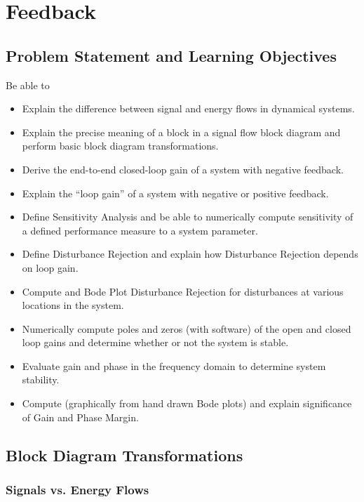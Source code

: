 %
%
%

\chapter{Feedback}\label{FeedbackChapter}

\section{Problem Statement and Learning Objectives}
Be able to

\begin{itemize}
    \item Explain the difference between signal and energy flows in dynamical systems.
    \item Explain the precise meaning of a block in a signal flow block diagram and
    perform basic block diagram transformations.
    \item  Derive the end-to-end closed-loop gain of a system with negative feedback.
    \item Explain the ``loop gain'' of a system with negative or positive feedback.
    \item Define Sensitivity Analysis and be able to numerically compute sensitivity of
    a defined performance measure to a system parameter.
    \item Define Disturbance Rejection and explain how Disturbance Rejection depends on
    loop gain.
    \item Compute and Bode Plot  Disturbance Rejection for disturbances at various locations in the system.
    \item Numerically compute poles and zeros (with software) of the open and closed loop gains and determine whether or not the system is stable.
    \item Evaluate gain and phase in the frequency domain to determine system stability.
    \item Compute (graphically from hand drawn Bode plots) and explain significance of Gain and Phase Margin.
\end{itemize}

\section{Block Diagram Transformations}

\subsection{Signals vs. Energy Flows}

